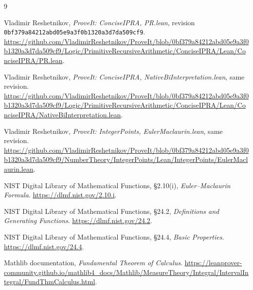 \documentclass[11pt]{article}
\theoremstyle{definition}
\newcommand{\code}[1]{\texttt{#1}}
\begin{document}
\begin{thebibliography}{9}
\small\raggedright
{}
Vladimir Reshetnikov, \emph{ProveIt: ConciseIPRA, PR.lean},
revision \code{0bf379a84212abd05e9a3f0b1320a3d7da509cf9}.
\url{https://github.com/VladimirReshetnikov/ProveIt/blob/0bf379a84212abd05e9a3f0b1320a3d7da509cf9/Logic/PrimitiveRecursiveArithmetic/ConciseIPRA/Lean/ConciseIPRA/PR.lean}.

Vladimir Reshetnikov, \emph{ProveIt: ConciseIPRA,
NativeBiInterpretation.lean}, same revision.
\url{https://github.com/VladimirReshetnikov/ProveIt/blob/0bf379a84212abd05e9a3f0b1320a3d7da509cf9/Logic/PrimitiveRecursiveArithmetic/ConciseIPRA/Lean/ConciseIPRA/NativeBiInterpretation.lean}.

Vladimir Reshetnikov, \emph{ProveIt: IntegerPoints,
EulerMaclaurin.lean}, same revision.
\url{https://github.com/VladimirReshetnikov/ProveIt/blob/0bf379a84212abd05e9a3f0b1320a3d7da509cf9/NumberTheory/IntegerPoints/Lean/IntegerPoints/EulerMaclaurin.lean}.

NIST Digital Library of Mathematical Functions,
\S2.10(i), \emph{Euler--Maclaurin Formula}.
\url{https://dlmf.nist.gov/2.10.i}.

NIST Digital Library of Mathematical Functions,
\S24.2, \emph{Definitions and Generating Functions}.
\url{https://dlmf.nist.gov/24.2}.

NIST Digital Library of Mathematical Functions,
\S24.4, \emph{Basic Properties}.
\url{https://dlmf.nist.gov/24.4}.

Mathlib documentation, \emph{Fundamental Theorem of Calculus}.
\url{https://leanprover-community.github.io/mathlib4_docs/Mathlib/MeasureTheory/Integral/IntervalIntegral/FundThmCalculus.html}.
\end{thebibliography}
\end{document}
